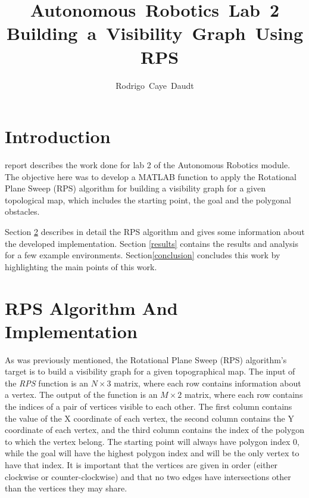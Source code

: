 \documentclass[journal]{IEEEtran}
\begin{document}
\title{Autonomous~Robotics~Lab~2 \\ Building~a~Visibility~Graph~Using~RPS}
%

\author{Rodrigo~Caye~Daudt}





\maketitle



\section{Introduction}

 report describes the work done for lab 2 of the Autonomous Robotics module. The objective here was to develop a MATLAB function to apply the Rotational Plane Sweep (RPS) algorithm for building a visibility graph for a given topological map, which includes the starting point, the goal and the polygonal obstacles.

Section \ref{rps} describes in detail the RPS algorithm and gives some information about the developed implementation. Section \ref{results} contains the results and analysis for a few example environments. Section\ref{conclusion} concludes this work by highlighting the main points of this work.

\section{RPS Algorithm And Implementation}\label{rps}

As was previously mentioned, the Rotational Plane Sweep (RPS) algorithm's target is to build a visibility graph for a given topographical map. The input of the \textit{RPS} function is an $N \times 3$ matrix, where each row contains information about a vertex. The output of the function is an $M \times 2$ matrix, where each row contains the indices of a pair of vertices visible to each other. The first column contains the value of the X coordinate of each vertex, the second column contains the Y coordinate of each vertex, and the third column contains the index of the polygon to which the vertex belong. The starting point will always have polygon index 0, while the goal will have the highest polygon index and will be the only vertex to have that index. It is important that the vertices are given in order (either clockwise or counter-clockwise) and that no two edges have intersections other than the vertices they may share.
\end{document}
